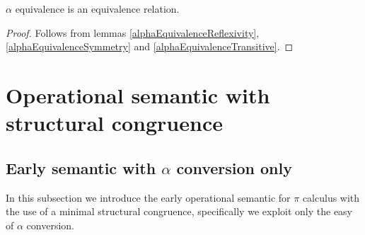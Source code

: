 \begin{theorem}
  $\alpha$ equivalence is an equivalence relation.
  \begin{proof}
    Follows from lemmas \ref{alphaEquivalenceReflexivity}, \ref{alphaEquivalenceSymmetry} and \ref{alphaEquivalenceTransitive}.
  \end{proof}
\end{theorem}



\section{Operational semantic with structural congruence}

\subsection{Early semantic with $\alpha$ conversion only}
In this subsection we introduce the early operational semantic for $\pi$ calculus with the use of a minimal structural congruence, specifically we exploit only the easy of $\alpha$ conversion.

